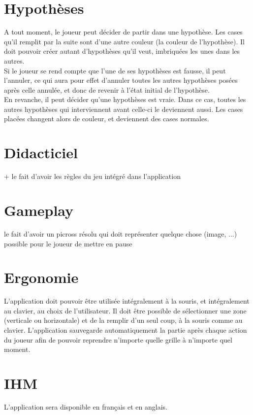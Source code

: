 \documentclass{report}
\begin{document}
		\section{Hypothèses}			
			A tout moment, le joueur peut décider de partir dans une hypothèse. Les cases qu'il remplit par la suite sont d'une autre couleur (la couleur de l'hypothèse). Il doit pouvoir créer autant d'hypothèses qu'il veut, imbriquées les unes dans les autres.\\
			Si le joueur se rend compte que l'une de ses hypothèses est fausse, il peut l'annuler, ce qui aura pour effet d'annuler toutes les autres hypothèses posées après celle annulée, et donc de revenir à l'état initial de l'hypothèse.\\
			En revanche, il peut décider qu'une hypothèses est vraie. Dans ce cas, toutes les autres hypothèses qui interviennent avant celle-ci le deviennent aussi. Les cases placées changent alors de couleur, et deviennent des cases normales.
		
		\section{Didacticiel}
			+ le fait d'avoir les règles du jeu intégré dans l'application
		
		\section{Gameplay}
			le fait d'avoir un picross résolu qui doit représenter quelque chose (image, ...)
			possible pour le joueur de mettre en pause

		\section{Ergonomie}
			L'application doit pouvoir être utilisée intégralement à la souris, et intégralement au clavier, au choix de l'utilisateur.
			Il doit être possible de sélectionner une zone (verticale ou horizontale) et de la remplir d'un seul coup, à la souris comme au clavier.
			L'application sauvegarde automatiquement la partie après chaque action du joueur afin de pouvoir reprendre n'importe quelle grille à n'importe quel moment.
			
		\section{IHM}
			L'application sera disponible en français et en anglais.
			
\end{document}
